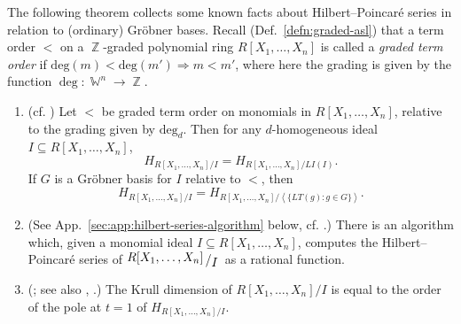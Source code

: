 \documentclass[11pt,reqno]{amsart}
\DeclareMathOperator{\Z}{\mathbb{Z}}
\DeclareMathOperator{\W}{\mathbb{W}}
\newcommand{\suchthat}{:}
\newcommand{\ideal}[1]{\left\langle#1\right\rangle}
\newcommand{\bigslant}[2]{{\raisebox{.2em}{$#1$}\left/\raisebox{-.2em}{$#2$}\right.}}
\theoremstyle{definition}
\numberwithin{equation}{section}
\begin{document}
The following theorem collects some known facts about Hilbert--Poincar\'e series in relation to (ordinary) Gröbner bases. Recall (Def.~\ref{defn:graded-asl}) that a term order $<$ on a $\Z$-graded polynomial ring $R[X_1,\dotsc,X_n]$ is called a \emph{graded term order} if $\mathrm{deg}(m) < \mathrm{deg}(m') \Rightarrow m < m'$, where here the grading is given by the function $\deg \colon \W^n \to \Z$. 

\begin{theorem} \label{thm:hilbert-series-facts}
\begin{enumerate}[label=(\Roman*),ref=(\Roman*)]
\item (cf. \cite[\S 9.3, Prop.~4]{CLO}) Let $<$ be graded term order on monomials in $R[X_1, \ldots, X_n]$, relative to the grading given by $\mathrm{deg}_d$. Then for any $d$-homogeneous ideal $I \subseteq R[X_1, \ldots, X_n]$, \[H_{R[X_1, \ldots, X_n] / I} = H_{R[X_1, \ldots, X_n] / LI(I)}.\] If $G$ is a Gröbner basis for $I$ relative to $<$, then \[H_{R[X_1, \ldots, X_n] / I} = H_{R[X_1, \ldots, X_n] / \ideal{\{LT(g) \suchthat g \in G\}}}.\]

\item (See App.~\ref{sec:app:hilbert-series-algorithm} below, cf. \cite[\S 10.2, Thm.~6]{CLO}.) There is an algorithm which, given a monomial ideal $I \subseteq R[X_1, \ldots, X_n]$, computes the Hilbert--Poincar\'e series of $\bigslant{R[X_1, \ldots, X_n]}{I}$ as a rational function. 

\item \label{thmhilberseriesfacts-pole} (\cite[Thm.~5.5]{smoke}; see also \cite[Prop~5.3.2]{benson}, \cite[p.~58]{stanley}.) The Krull dimension of $R[X_1,\dotsc,X_n]/I$ is equal to the order of the pole at $t=1$ of $H_{R[X_1,\dotsc,X_n] / I}$. 
\end{enumerate}
\end{theorem}
\end{document}

